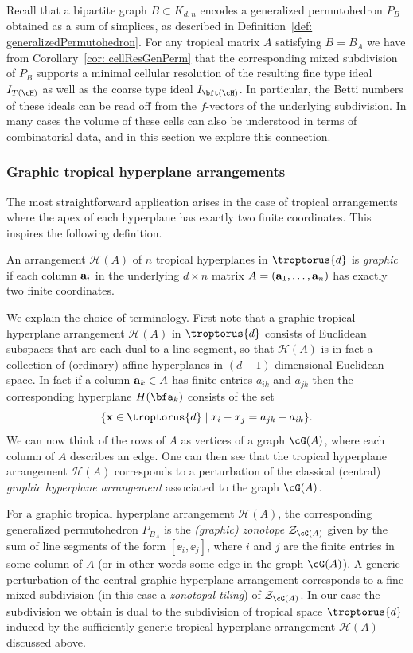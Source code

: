 Recall that a bipartite graph $B \subset K_{d,n}$ encodes a generalized permutohedron $P_B$ obtained as a sum of simplices, as described in Definition~\ref{def: generalizedPermutohedron}. For any tropical matrix $A$ satisfying $B = B_A$ we have from Corollary~\ref{cor: cellResGenPerm} that the corresponding mixed subdivision of $P_B$ supports a minimal cellular resolution of the resulting fine type ideal $I_{T(\cH)}$ as well as the coarse type ideal $I_{\bft(\cH)}$.  In particular, the Betti numbers of these ideals can be read off from the $f$-vectors of the underlying subdivision.  In many cases the volume of these cells can also be understood in terms of combinatorial data, and in this section we explore this connection.
\subsubsection{Graphic tropical hyperplane arrangements}\label{subsec: graphic}


The most straightforward application arises in the case of tropical arrangements where the apex of each hyperplane has exactly two finite coordinates.  This inspires the following definition.

\begin{definition}\label{def: graphic}
An arrangement ${\mathcal H}(A)$ of $n$ tropical hyperplanes in $\troptorus{d}$ is \emph{graphic} if each column ${\bf a}_i$ in the underlying $d \times n$ matrix $A = ({\bf a}_1, \dots, {\bf a}_n)$ has exactly two finite coordinates.
\end{definition}

We explain the choice of terminology. First note that a graphic tropical hyperplane arrangement ${\mathcal H}(A)$ in $\troptorus{d}$ consists of Euclidean subspaces that are each dual to a line segment, so that ${\mathcal H}(A)$ is in fact a collection of (ordinary) affine hyperplanes in $(d-1)$-dimensional Euclidean space. In fact if a column ${\bf a}_k \in A$ has finite entries $a_{ik}$ and $a_{jk}$ then the corresponding hyperplane $H(\bfa_k)$  consists of the set 
\[\{{\bf x} \in \troptorus{d}\mid x_i-x_j = a_{jk} - a_{ik}\}.\]
\noindent
We can now think of the rows of $A$ as vertices of a graph ${\cG}(A)$, where each column of $A$ describes an edge.  One can then see that the tropical hyperplane arrangement ${\mathcal H}(A)$ corresponds to a perturbation of the classical (central) \emph{graphic hyperplane arrangement} associated to the graph $\cG(A)$.


For a graphic tropical hyperplane arrangement ${\mathcal H}(A)$, the corresponding generalized permutohedron $P_{B_A}$ is the \emph{(graphic) zonotope} ${\mathcal Z}_{\cG(A)}$ given by the sum of line segments of the form $[\ee_i,\ee_j]$, where $i$ and $j$ are the finite entries in some column of $A$ (or in other words some edge in the graph $\cG(A)$).  A generic perturbation of the central graphic hyperplane arrangement  corresponds to a fine mixed subdivision (in this case a \emph{zonotopal tiling}) of ${\mathcal Z}_{\cG(A)}$. In our case the subdivision we obtain is dual to the subdivision of tropical space $\troptorus{d}$ induced by the sufficiently generic tropical hyperplane arrangement ${\mathcal H}(A)$ discussed above.

